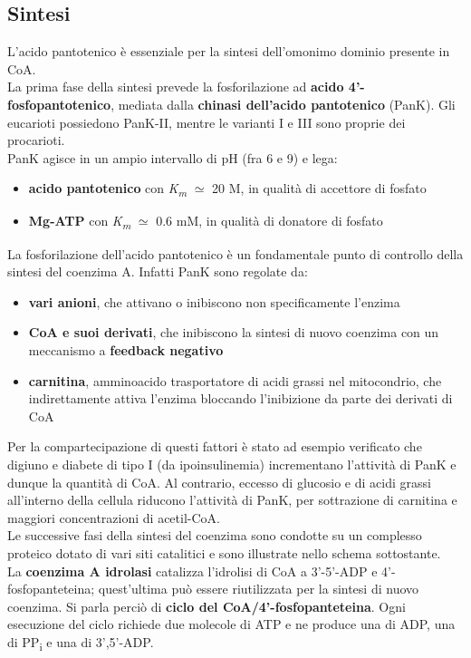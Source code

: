 \documentclass[a4paper, 12pt]{article}
\begin{document}
\subsection{Sintesi}
L'acido pantotenico è essenziale per la sintesi dell'omonimo dominio presente in CoA.\\
La prima fase della sintesi prevede la fosforilazione ad \textbf{acido 4'-fosfopantotenico}, mediata dalla \textbf{chinasi dell'acido pantotenico} (PanK). Gli eucarioti possiedono PanK-II, mentre le varianti I e III sono proprie dei procarioti.\\
PanK agisce in un ampio intervallo di pH (fra 6 e 9) e lega: \begin{itemize}
\item \textbf{acido pantotenico} con \textit{K\textsubscript{m}} $\simeq$ 20 {\textmu}M, in qualità di accettore di fosfato
\item  \textbf{Mg-ATP} con \textit{K\textsubscript{m}} $\simeq$ 0.6 mM, in qualità di donatore di fosfato
\end{itemize}
La fosforilazione dell'acido pantotenico è un fondamentale punto di controllo della sintesi del coenzima A. Infatti PanK sono regolate da:
\begin{itemize}
\item \textbf{vari anioni}, che attivano o inibiscono non specificamente l'enzima
\item \textbf{CoA e suoi derivati}, che inibiscono la sintesi di nuovo coenzima con un meccanismo a \textbf{feedback negativo}
\item \textbf{carnitina}, amminoacido trasportatore di acidi grassi nel mitocondrio, che indirettamente attiva l'enzima bloccando l'inibizione da parte dei derivati di CoA
\end{itemize}
Per la compartecipazione di questi fattori è stato ad esempio verificato che digiuno e diabete di tipo I (da ipoinsulinemia) incrementano l'attività di PanK e dunque la quantità di CoA. Al contrario, eccesso di glucosio e di acidi grassi all'interno della cellula riducono l'attività di PanK, per sottrazione di carnitina e maggiori concentrazioni di acetil-CoA.\\
Le successive fasi della sintesi del coenzima sono condotte su un complesso proteico dotato di vari siti catalitici e sono illustrate nello schema sottostante.\\
La \textbf{coenzima A idrolasi} catalizza l'idrolisi di CoA a 3'-5'-ADP e 4'-fosfopanteteina; quest'ultima può essere riutilizzata per la sintesi di nuovo coenzima. Si parla perciò di \textbf{ciclo del CoA/4'-fosfopanteteina}. Ogni esecuzione del ciclo richiede due molecole di ATP e ne produce una di ADP, una di PP\textsubscript{i} e una di 3',5'-ADP.
\end{document}
